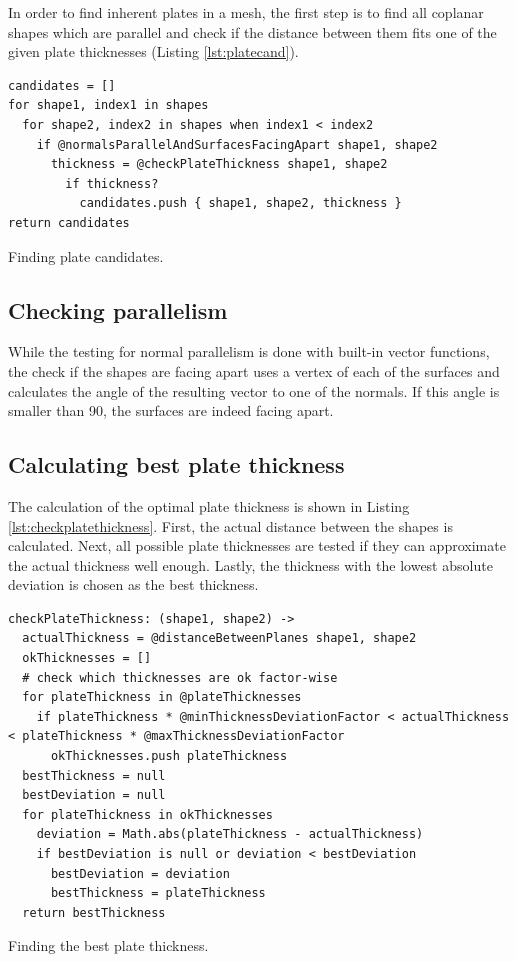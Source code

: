 \documentclass[../ClassicThesis.tex]{subfiles}
\begin{document}
In order to find inherent plates in a mesh, the first step is to find all coplanar shapes which are parallel and check if the distance between them fits one of the given plate thicknesses (Listing \ref{lst:platecand}).

\begin{listing}[ht]
\begin{verbatim}
candidates = []
for shape1, index1 in shapes
  for shape2, index2 in shapes when index1 < index2
    if @normalsParallelAndSurfacesFacingApart shape1, shape2
      thickness = @checkPlateThickness shape1, shape2
        if thickness?
          candidates.push { shape1, shape2, thickness }
return candidates
\end{verbatim}
\caption{Finding plate candidates.}
\label{lst:platecand}
\end{listing}

\subsection{Checking parallelism}

While the testing for normal parallelism is done with built-in vector functions, the check if the shapes are facing apart uses a vertex of each of the surfaces and calculates the angle of the resulting vector to one of the normals. If this angle is smaller than 90\textdegree, the surfaces are indeed facing apart.

\subsection{Calculating best plate thickness}

The calculation of the optimal plate thickness is shown in Listing \ref{lst:checkplatethickness}. First, the actual distance between the shapes is calculated. Next, all possible plate thicknesses are tested if they can approximate the actual thickness well enough. Lastly, the thickness with the lowest absolute deviation is chosen as the best thickness.

\begin{listing}[ht]
\begin{verbatim}
checkPlateThickness: (shape1, shape2) ->
  actualThickness = @distanceBetweenPlanes shape1, shape2
  okThicknesses = []
  # check which thicknesses are ok factor-wise
  for plateThickness in @plateThicknesses
    if plateThickness * @minThicknessDeviationFactor < actualThickness < plateThickness * @maxThicknessDeviationFactor
      okThicknesses.push plateThickness
  bestThickness = null
  bestDeviation = null
  for plateThickness in okThicknesses
    deviation = Math.abs(plateThickness - actualThickness)
    if bestDeviation is null or deviation < bestDeviation
      bestDeviation = deviation
      bestThickness = plateThickness
  return bestThickness
\end{verbatim}
\caption{Finding the best plate thickness.}
\label{lst:checkplatethickness}
\end{listing}
\end{document}
